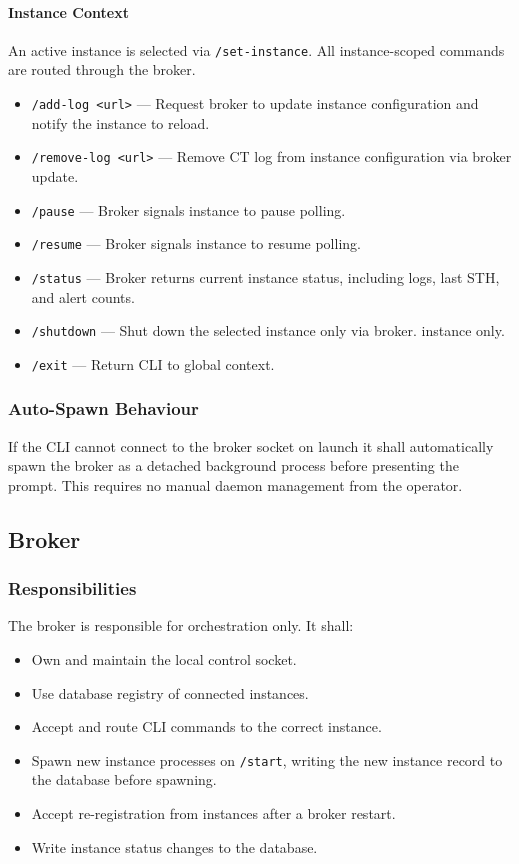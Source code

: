 \documentclass{article}
\begin{document}
\paragraph{Instance Context}
An active instance is selected via \texttt{/set-instance}. All instance-scoped
commands are routed through the broker.

\begin{itemize}
    \item \texttt{/add-log <url>} --- Request broker to update instance
    configuration and notify the instance to reload.
    \item \texttt{/remove-log <url>} --- Remove CT log from instance
    configuration via broker update.
    \item \texttt{/pause} --- Broker signals instance to pause polling.
    \item \texttt{/resume} --- Broker signals instance to resume polling.
    \item \texttt{/status} --- Broker returns current instance status,
    including logs, last STH, and alert counts.
    \item \texttt{/shutdown} --- Shut down the selected instance only via broker.
    instance only.
    \item \texttt{/exit} --- Return CLI to global context.
\end{itemize}

\subsubsection{Auto-Spawn Behaviour}
If the CLI cannot connect to the broker socket on launch it shall
automatically spawn the broker as a detached background process before
presenting the prompt. This requires no manual daemon management from the
operator.

\subsection{Broker}

\subsubsection{Responsibilities}
The broker is responsible for orchestration only. It shall:
\begin{itemize}
    \item Own and maintain the local control socket.
    \item Use database registry of connected instances.
    \item Accept and route CLI commands to the correct instance.
    \item Spawn new instance processes on \texttt{/start}, writing the new
    instance record to the database before spawning.
    \item Accept re-registration from instances after a broker restart.
    \item Write instance status changes to the database.
\end{itemize}
\end{document}
